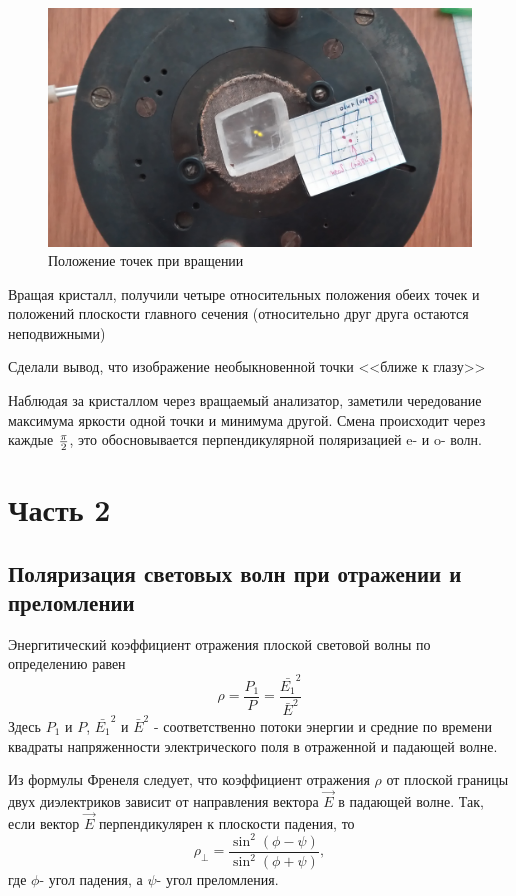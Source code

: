 \begin{figure}[H]
	\centering
	\includegraphics[width=\textwidth]{pic/dv.jpg}
	\caption{Положение точек при вращении}
	\label{fig:figure2}
\end{figure}

Вращая кристалл, получили четыре относительных положения обеих точек и положений плоскости главного сечения (относительно друг друга остаются неподвижными)

Сделали вывод, что изображение необыкновенной точки <<ближе к глазу>>

Наблюдая за кристаллом через вращаемый анализатор, заметили чередование максимума яркости одной точки и минимума другой. Смена происходит через каждые $\pi\over2$, это обосновывается перпендикулярной поляризацией e- и o- волн.
\section{Часть 2}
\subsection{Поляризация световых волн при отражении и преломлении}
Энергитический коэффициент отражения плоской световой волны по определению равен
\begin{equation}
	\rho=\frac{P_1}{P}=\frac{\bar{E_1}^2}{\bar{E}^2}
\end{equation}
Здесь $P_1$ и $P$, $\bar{E_1}^2$ и $\bar{E}^2$ - соответственно потоки энергии и средние по времени квадраты напряженности электрического поля в отраженной и падающей волне.

Из формулы Френеля следует, что коэффициент отражения $\rho$ от плоской границы двух диэлектриков зависит от направления вектора $\vec{E}$ в падающей волне. Так, если вектор $\vec{E}$ перпендикулярен к плоскости падения, то 
\begin{equation}
\label{eq:2.1}
	\rho_{\bot}=\frac{\sin^2(\phi-\psi)}{\sin^2(\phi+\psi)},
\end{equation}
где $\phi$- угол падения, а $\psi$- угол преломления.

